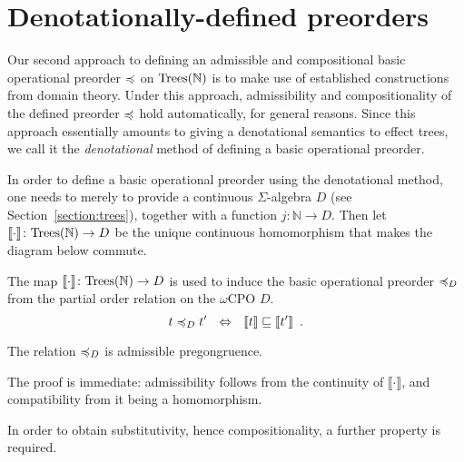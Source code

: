 \section{Denotationally-defined preorders}
\label{section:denotational}

Our second approach to defining an admissible and compositional basic operational
preorder $\preccurlyeq$ on $\textnormal{Trees}(\mathbb{N})$ is to make use of established constructions from domain theory.
Under this approach, admissibility and compositionality of the defined preorder $\preccurlyeq$ hold automatically,
for general reasons. Since this approach essentially amounts to giving a denotational semantics to effect trees, we call it the \emph{denotational} method of defining a basic operational preorder.



In order to define a basic operational preorder using the denotational method, one needs to merely to provide
a continuous $\Sigma$-algebra $D$ (see Section~\ref{section:trees}),  together with a function
$j\colon \mathbb{N} \to D$. 
Then let   $\llbracket \cdot \rrbracket \colon \textnormal{Trees}(\mathbb{N}) \to D$ be the unique continuous homomorphism that makes the diagram below commute.
   \begin{center}
    \end{center}
\noindent
The map $\llbracket \cdot \rrbracket \colon \textnormal{Trees}(\mathbb{N}) \to D$ is used to induce
the basic operational preorder $\preccurlyeq_D$ from the partial order relation on the $\omega$CPO $D$.
\[
t \preccurlyeq_D t' ~~ \Leftrightarrow ~~ \llbracket t \rrbracket \sqsubseteq \llbracket t'  \rrbracket \enspace .
\]
\begin{proposition}
The relation $\preccurlyeq_D$ is admissible pregongruence.
\end{proposition}
%
The proof is immediate: admissibility follows from the continuity of 
$\llbracket \cdot \rrbracket$, and compatibility from it being a homomorphism.

In order to obtain substitutivity, hence compositionality, a further property is required.

